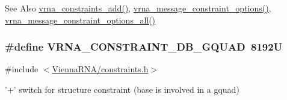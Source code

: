 \begin{DoxySeeAlso}{See Also}
\hyperlink{group__constraints_ga35a401f680969a556858a8dd5f1d07cc}{vrna\-\_\-constraints\-\_\-add()}, \hyperlink{group__constraints_gaa1f20b53bf09ac2e6b0dbb13f7d89670}{vrna\-\_\-message\-\_\-constraint\-\_\-options()}, \hyperlink{group__constraints_gaec7e13fa0465c2acc7a621d1aecb709f}{vrna\-\_\-message\-\_\-constraint\-\_\-options\-\_\-all()} 
\end{DoxySeeAlso}
\hypertarget{group__constraints_ga75cfab03cdc97c95b3ce8bb29f52b08e}{
\subsubsection[{V\-R\-N\-A\-\_\-\-C\-O\-N\-S\-T\-R\-A\-I\-N\-T\-\_\-\-D\-B\-\_\-\-G\-Q\-U\-A\-D}]{\setlength{\rightskip}{0pt plus 5cm}\#define V\-R\-N\-A\-\_\-\-C\-O\-N\-S\-T\-R\-A\-I\-N\-T\-\_\-\-D\-B\-\_\-\-G\-Q\-U\-A\-D~8192\-U}}\label{group__constraints_ga75cfab03cdc97c95b3ce8bb29f52b08e}


{\ttfamily \#include $<$\hyperlink{constraints_8h}{Vienna\-R\-N\-A/constraints.\-h}$>$}



'+' switch for structure constraint (base is involved in a gquad) 

